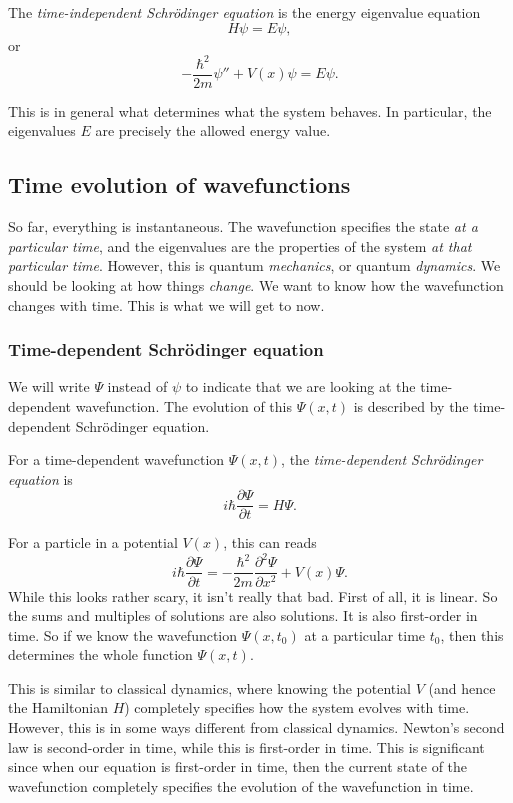 \documentclass[a4paper]{article}
\begin{document}
\begin{defi}
  The \emph{time-independent Schr\"odinger equation} is the energy eigenvalue equation
  \[
    H\psi = E\psi,
  \]
  or
  \[
    -\frac{\hbar^2}{2m}\psi'' + V(x) \psi = E\psi.
  \]
\end{defi}
This is in general what determines what the system behaves. In particular, the eigenvalues $E$ are precisely the allowed energy value.

\subsection{Time evolution of wavefunctions}
So far, everything is instantaneous. The wavefunction specifies the state \emph{at a particular time}, and the eigenvalues are the properties of the system \emph{at that particular time}. However, this is quantum \emph{mechanics}, or quantum \emph{dynamics}. We should be looking at how things \emph{change}. We want to know how the wavefunction changes with time. This is what we will get to now.

\subsubsection{Time-dependent Schr\"odinger equation}
We will write $\Psi$ instead of $\psi$ to indicate that we are looking at the time-dependent wavefunction. The evolution of this $\Psi(x, t)$ is described by the time-dependent Schr\"odinger equation.
\begin{defi}
  For a time-dependent wavefunction $\Psi(x, t)$, the \emph{time-dependent Schr\"odinger equation} is
  \[
    i\hbar \frac{\partial \Psi}{\partial t} = H\Psi.\tag{$*$}
  \]
\end{defi}
For a particle in a potential $V(x)$, this can reads
\[
  i\hbar \frac{\partial \Psi}{\partial t} = -\frac{\hbar^2}{2m}\frac{\partial^2 \Psi}{\partial x^2} + V(x) \Psi.
\]
While this looks rather scary, it isn't really that bad. First of all, it is linear. So the sums and multiples of solutions are also solutions. It is also first-order in time. So if we know the wavefunction $\Psi(x, t_0)$ at a particular time $t_0$, then this determines the whole function $\Psi(x, t)$.

This is similar to classical dynamics, where knowing the potential $V$ (and hence the Hamiltonian $H$) completely specifies how the system evolves with time. However, this is in some ways different from classical dynamics. Newton's second law is second-order in time, while this is first-order in time. This is significant since when our equation is first-order in time, then the current state of the wavefunction completely specifies the evolution of the wavefunction in time.
\end{document}

